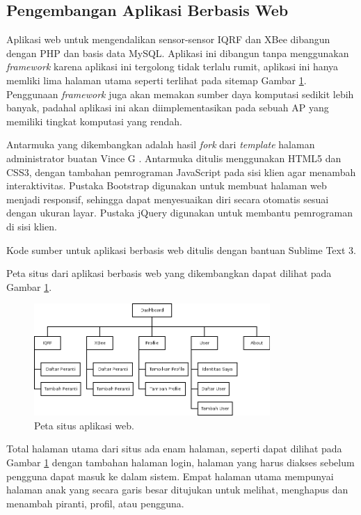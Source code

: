 		\subsection{Pengembangan Aplikasi Berbasis Web}
			Aplikasi web untuk mengendalikan sensor-sensor IQRF dan XBee dibangun dengan PHP dan basis data MySQL. Aplikasi ini dibangun tanpa menggunakan \emph{framework} karena aplikasi ini tergolong tidak terlalu rumit, aplikasi ini hanya memliki lima halaman utama seperti terlihat pada sitemap Gambar \ref{sitemap}. Penggunaan \emph{framework} juga akan memakan sumber daya komputasi sedikit lebih banyak, padahal aplikasi ini akan diimplementasikan pada sebuah AP yang memiliki tingkat komputasi yang rendah.

			Antarmuka yang dikembangkan adalah hasil \emph{fork} dari \emph{template} halaman administrator buatan Vince G \cite{Gabriel2013}. Antarmuka ditulis menggunakan HTML5 dan CSS3, dengan tambahan pemrograman JavaScript pada sisi klien agar menambah interaktivitas. Pustaka Bootstrap digunakan untuk membuat halaman web menjadi responsif, sehingga dapat menyesuaikan diri secara otomatis sesuai dengan ukuran layar. Pustaka jQuery digunakan untuk membantu pemrograman di sisi klien.

			Kode sumber untuk aplikasi berbasis web ditulis dengan bantuan Sublime Text 3.
			
			Peta situs dari aplikasi berbasis web yang dikembangkan dapat dilihat pada Gambar \ref{sitemap}.
			
			\begin{figure}[H]
			  \centering
			    \includegraphics[width=0.8\textwidth]{gambar/sitemap}
			    \caption{Peta situs aplikasi web.}
			    \label{sitemap}
			\end{figure}

			Total halaman utama dari situs ada enam halaman, seperti dapat dilihat pada Gambar \ref{sitemap} dengan tambahan halaman login, halaman yang harus diakses sebelum pengguna dapat masuk ke dalam sistem. Empat halaman utama mempunyai halaman anak yang secara garis besar ditujukan untuk melihat, menghapus dan menambah piranti, profil, atau pengguna.


